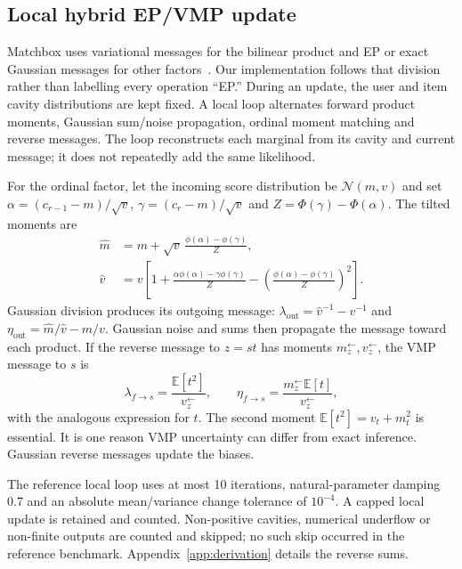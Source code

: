 \documentclass[11pt,a4paper]{article}
\newcommand{\E}{\mathbb E}
\newcommand{\N}{\mathcal N}
\begin{document}
\subsection{Local hybrid EP/VMP update}
Matchbox uses variational messages for the bilinear product and EP or exact
Gaussian messages for other factors~\cite{stern2009}. Our implementation follows
that division rather than labelling every operation ``EP.'' During an update,
the user and item cavity distributions are kept fixed. A local loop alternates
forward product moments, Gaussian sum/noise propagation, ordinal moment matching
and reverse messages. The loop reconstructs each marginal from its cavity and
current message; it does not repeatedly add the same likelihood.

For the ordinal factor, let the incoming score distribution be $\N(m,v)$ and
set $\alpha=(c_{r-1}-m)/\sqrt v$, $\gamma=(c_r-m)/\sqrt v$ and
$Z=\Phi(\gamma)-\Phi(\alpha)$. The tilted moments are
\begin{align}
\widehat m&=m+\sqrt v\,\frac{\phi(\alpha)-\phi(\gamma)}{Z},\label{eq:truncmean}\\
\widehat v&=v\left[1+\frac{\alpha\phi(\alpha)-\gamma\phi(\gamma)}{Z}
-\left(\frac{\phi(\alpha)-\phi(\gamma)}{Z}\right)^2\right].\label{eq:truncvar}
\end{align}
Gaussian division produces its outgoing message:
$\lambda_{\mathrm{out}}=\widehat v^{-1}-v^{-1}$ and
$\eta_{\mathrm{out}}=\widehat m/\widehat v-m/v$.
Gaussian noise and sums then propagate the message toward each product.
If the reverse message to $z=st$ has moments $m_z^{\leftarrow},v_z^{\leftarrow}$,
the VMP message to $s$ is
\begin{equation}
\lambda_{f\to s}=\frac{\E[t^2]}{v_z^{\leftarrow}},\qquad
\eta_{f\to s}=\frac{m_z^{\leftarrow}\E[t]}{v_z^{\leftarrow}},\label{eq:vmp}
\end{equation}
with the analogous expression for $t$. The second moment
$\E[t^2]=v_t+m_t^2$ is essential. It is one reason VMP uncertainty can differ
from exact inference. Gaussian reverse messages update the biases.

The reference local loop uses at most 10 iterations, natural-parameter damping
0.7 and an absolute mean/variance change tolerance of $10^{-4}$. A capped local
update is retained and counted. Non-positive cavities, numerical underflow or
non-finite outputs are counted and skipped; no such skip occurred in the
reference benchmark. Appendix~\ref{app:derivation} details the reverse sums.
\end{document}
